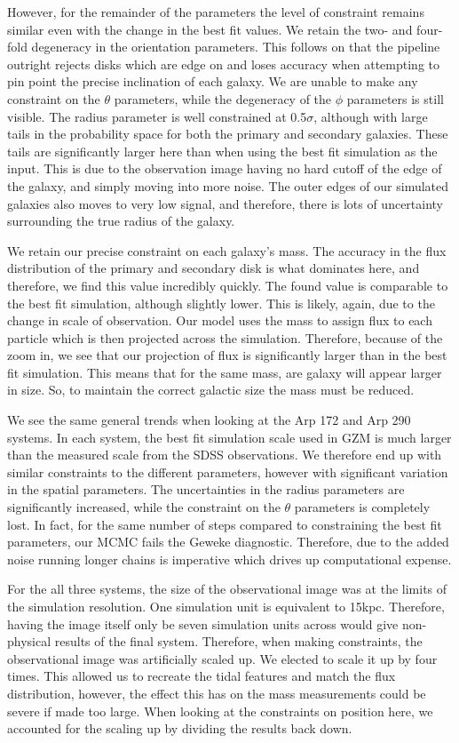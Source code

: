 However, for the remainder of the parameters the level of constraint remains similar even with the change in the best fit values. We retain the two- and four-fold degeneracy in the orientation parameters. This follows on that the pipeline outright rejects disks which are edge on and loses accuracy when attempting to pin point the precise inclination of each galaxy. We are unable to make any constraint on the $\theta$ parameters, while the degeneracy of the $\phi$ parameters is still visible. The radius parameter is well constrained at 0.5$\sigma$, although with large tails in the probability space for both the primary and secondary galaxies. These tails are significantly larger here than when using the best fit simulation as the input. This is due to the observation image having no hard cutoff of the edge of the galaxy, and simply moving into more noise. The outer edges of our simulated galaxies also moves to very low signal, and therefore, there is lots of uncertainty surrounding the true radius of the galaxy. 

We retain our precise constraint on each galaxy's mass. The accuracy in the flux distribution of the primary and secondary disk is what dominates here, and therefore, we find this value incredibly quickly. The found value is comparable to the best fit simulation, although slightly lower. This is likely, again, due to the change in scale of observation. Our model uses the mass to assign flux to each particle which is then projected across the simulation. Therefore, because of the zoom in, we see that our projection of flux is significantly larger than in the best fit simulation. This means that for the same mass, are galaxy will appear larger in size. So, to maintain the correct galactic size the mass must be reduced. 

We see the same general trends when looking at the Arp 172 and Arp 290 systems. In each system, the best fit simulation scale used in GZM is much larger than the measured scale from the SDSS observations. We therefore end up with similar constraints to the different parameters, however with significant variation in the spatial parameters. The uncertainties in the radius parameters are significantly increased, while the constraint on the $\theta$ parameters is completely lost. In fact, for the same number of steps compared to constraining the best fit parameters, our MCMC fails the Geweke diagnostic. Therefore, due to the added noise running longer chains is imperative which drives up computational expense.

For the all three systems, the size of the observational image was at the limits of the simulation resolution. One simulation unit is equivalent to 15kpc. Therefore, having the image itself only be seven simulation units across would give non-physical results of the final system. Therefore, when making constraints, the observational image was artificially scaled up. We elected to scale it up by four times. This allowed us to recreate the tidal features and match the flux distribution, however, the effect this has on the mass measurements could be severe if made too large. When looking at the constraints on position here, we accounted for the scaling up by dividing the results back down. 

